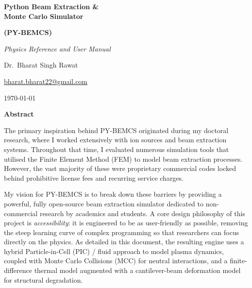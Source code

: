 \documentclass[11pt,a4paper]{article}
\newcommand{\PYBEMCS}{PY-BEMCS}
\begin{document}
\begin{titlepage}
\centering
\vspace*{3cm}

{\Huge\bfseries Python Beam Extraction \&\\[0.3em] Monte Carlo Simulator \par}
\vspace{0.5cm}
{\Large\bfseries (\PYBEMCS)\par}

\vspace{1.5cm}
{\large\textit{Physics Reference and User Manual}\par}

\vspace{3cm}
{\large Dr.~Bharat Singh Rawat\par}
\vspace{0.3cm}
{\normalsize \href{mailto:bharat.bharat22@gmail.com}{bharat.bharat22@gmail.com}\par}

\vfill
{\normalsize \today\par}
\end{titlepage}

\begin{center}
{\Large\bfseries Abstract}
\end{center}
\vspace{0.5em}

The primary inspiration behind \PYBEMCS{} originated during my doctoral
research, where I worked extensively with ion sources and beam
extraction systems. Throughout that time, I evaluated numerous
simulation tools that utilised the Finite Element Method (FEM) to model
beam extraction processes. However, the vast majority of these were
proprietary commercial codes locked behind prohibitive license fees and
recurring service charges.

My vision for \PYBEMCS{} is to break down these barriers by providing a
powerful, fully open-source beam extraction simulator dedicated to
non-commercial research by academics and students.  A core design
philosophy of this project is \emph{accessibility}: it is engineered to
be as user-friendly as possible, removing the steep learning curve of
complex programming so that researchers can focus directly on the
physics.  As detailed in this document, the resulting engine uses a
hybrid Particle-in-Cell (PIC) / fluid approach to model plasma
dynamics, coupled with Monte Carlo Collisions (MCC) for neutral
interactions, and a finite-difference thermal model augmented with a
cantilever-beam deformation model for structural degradation.
\end{document}
